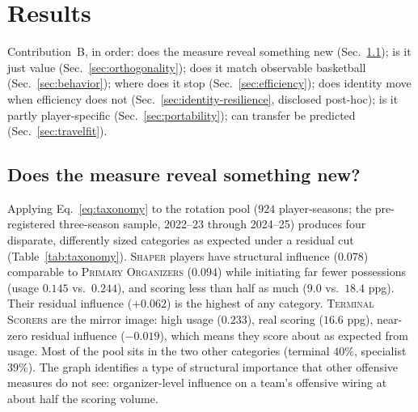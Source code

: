 \documentclass[11pt]{article}
\begin{document}
\section{Results}
\label{sec:results}

Contribution~B, in order: does the measure reveal something new
(Sec.~\ref{sec:emerge}); is it just value (Sec.~\ref{sec:orthogonality}); does it match
observable basketball (Sec.~\ref{sec:behavior}); where does it stop
(Sec.~\ref{sec:efficiency}); does identity move when efficiency does not
(Sec.~\ref{sec:identity-resilience}, disclosed post-hoc); is it partly player-specific
(Sec.~\ref{sec:portability}); can transfer be predicted (Sec.~\ref{sec:travelfit}).

\subsection{Does the measure reveal something new?}
\label{sec:emerge}

Applying Eq.~\eqref{eq:taxonomy} to the rotation pool ($924$ player-seasons; the
pre-registered three-season sample, 2022--23 through 2024--25) produces four disparate,
differently sized categories as expected under a residual cut (Table~\ref{tab:taxonomy}).
\textsc{Shaper} players have structural influence ($0.078$) comparable to
\textsc{Primary Organizers} ($0.094$) while initiating far fewer possessions (usage $0.145$
vs.\ $0.244$), and scoring less than half as much ($9.0$ vs.\ $18.4$ ppg). Their residual
influence ($+0.062$) is the highest of any category. \textsc{Terminal Scorers} are the
mirror image: high usage ($0.233$), real scoring ($16.6$ ppg), near-zero residual influence
($-0.019$), which means they score about as expected from usage. Most of the pool sits in
the two other categories (terminal $40\%$, specialist $39\%$). The graph identifies a type of
structural importance that other offensive measures do not see: organizer-level influence on
a team's offensive wiring at about half the scoring volume.
\end{document}
